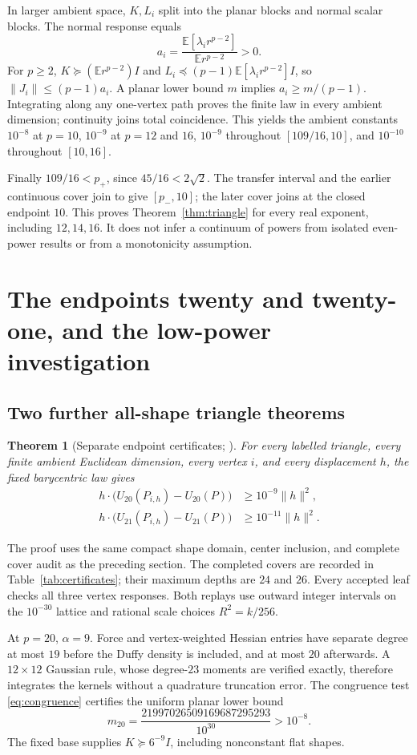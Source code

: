 \documentclass[11pt]{article}
\newtheorem{theorem}{Theorem}[section]
\theoremstyle{definition}
\newcommand{\E}{\mathbb E}
\newcommand{\pn}{p_{-}}
\newcommand{\pp}{p_{+}}
\begin{document}
In larger ambient space, $K,L_i$ split into the planar blocks and normal
scalar blocks. The normal response equals
\[
 a_i=\frac{\E[\lambda_i r^{p-2}]}{\E r^{p-2}}>0.
\]
For $p\ge2$, $K\succeq(\E r^{p-2})I$ and
$L_i\preceq(p-1)\E[\lambda_i r^{p-2}]I$, so
$\|J_i\|\le(p-1)a_i$. A planar lower bound $m$ implies
$a_i\ge m/(p-1)$. Integrating along any one-vertex path proves the finite
law in every ambient dimension; continuity joins total coincidence.
This yields the ambient constants $10^{-8}$ at $p=10$, $10^{-9}$ at
$p=12$ and $16$, $10^{-9}$ throughout $[109/16,10]$, and $10^{-10}$
throughout $[10,16]$.

Finally $109/16<\pp$, since $45/16<2\sqrt2$. The transfer interval and
the earlier continuous cover join to give $[\pn,10]$; the later cover
joins at the closed endpoint $10$. This proves Theorem~\ref{thm:triangle}
for every real exponent, including $12,14,16$. It does not infer a continuum
of powers from isolated even-power results or from a monotonicity assumption.

\section{The endpoints twenty and twenty-one, and the low-power investigation}
\subsection{Two further all-shape triangle theorems}
\begin{theorem}[Separate endpoint certificates; \cite{Triangle20,Triangle21}]
\label{thm:endpoints}
For every labelled triangle, every finite ambient Euclidean dimension,
every vertex $i$, and every displacement $h$, the fixed barycentric law gives
\begin{align}
 h\cdot\bigl(U_{20}(P_{i,h})-U_{20}(P)\bigr)&\ge10^{-9}\|h\|^2,\label{eq:p20}\\
 h\cdot\bigl(U_{21}(P_{i,h})-U_{21}(P)\bigr)&\ge10^{-11}\|h\|^2.\label{eq:p21}
\end{align}
\end{theorem}
The proof uses the same compact shape domain, center inclusion, and complete
cover audit as the preceding section. The completed covers are recorded in
Table~\ref{tab:certificates}; their maximum depths are $24$ and $26$.
Every accepted leaf checks all three vertex responses. Both replays use
outward integer intervals on the $10^{-30}$ lattice and rational scale
choices $R^2=k/256$.

At $p=20$, $\alpha=9$. Force and vertex-weighted Hessian entries have
separate degree at most $19$ before the Duffy density is included, and at
most $20$ afterwards. A $12\times12$ Gaussian rule, whose degree-$23$
moments are verified exactly, therefore integrates the kernels without a
quadrature truncation error. The congruence test \eqref{eq:congruence}
certifies the uniform planar lower bound
\[
 m_{20}=\frac{21997026509169687295293}{10^{30}}>10^{-8}.
\]
The fixed base supplies $K\succeq6^{-9}I$, including nonconstant flat shapes.
\end{document}
